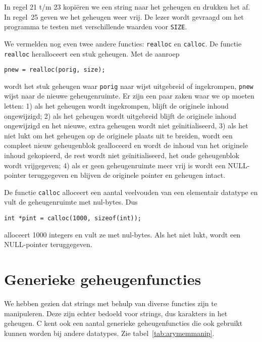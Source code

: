 
In regel 21 t/m 23 kopiëren we een string naar het geheugen en drukken het af. In regel~25 geven we het geheugen weer vrij. De lezer wordt gevraagd om het programma te testen met verschillende waarden voor \texttt{SIZE}.

We vermelden nog even twee andere functies: \texttt{realloc} en \texttt{calloc}. De functie \texttt{realloc} heralloceert een stuk geheugen. Met de aanroep

\hspace*{1em}\texttt{pnew = realloc(porig, size);}

wordt het stuk geheugen waar \texttt{porig} naar wijst uitgebreid of ingekrompen, \texttt{pnew} wijst naar de nieuwe geheugenruimte. Er zijn een paar zaken waar we op moeten letten: 1) als het geheugen wordt ingekrompen, blijft de originele inhoud ongewijzigd; 2) als het geheugen wordt uitgebreid blijft de originele inhoud ongewijzigd en het nieuwe, extra geheugen wordt niet geïnitialiseerd, 3) als het niet lukt om het geheugen op de originele plaats uit te breiden, wordt een compleet nieuw geheugenblok gealloceerd en wordt de inhoud van het originele inhoud gekopieerd, de rest wordt niet geïnitialiseerd, het oude geheugenblok wordt vrijgegeven; 4) als er geen geheugenruimte meer vrij is wordt een NULL-pointer teruggegeven en blijven de originele pointer en geheugen intact.

De functie \texttt{calloc} alloceert een aantal veelvouden van een elementair datatype en vult de geheugenruimte met nul-bytes. Dus

\hspace*{1em}\texttt{int *pint = calloc(1000, sizeof(int));}

alloceert 1000 integers en vult ze met nul-bytes. Als het niet lukt, wordt een NULL-pointer teruggegeven.


\section{Generieke geheugenfuncties}
We hebben gezien dat strings met behulp van diverse functies zijn te manipuleren. Deze zijn echter bedoeld voor strings, dus karakters in het geheugen. C kent ook een aantal generieke geheugenfuncties die ook gebruikt kunnen worden bij andere datatypes. Zie tabel~\ref{tab:arymemmanip}.

